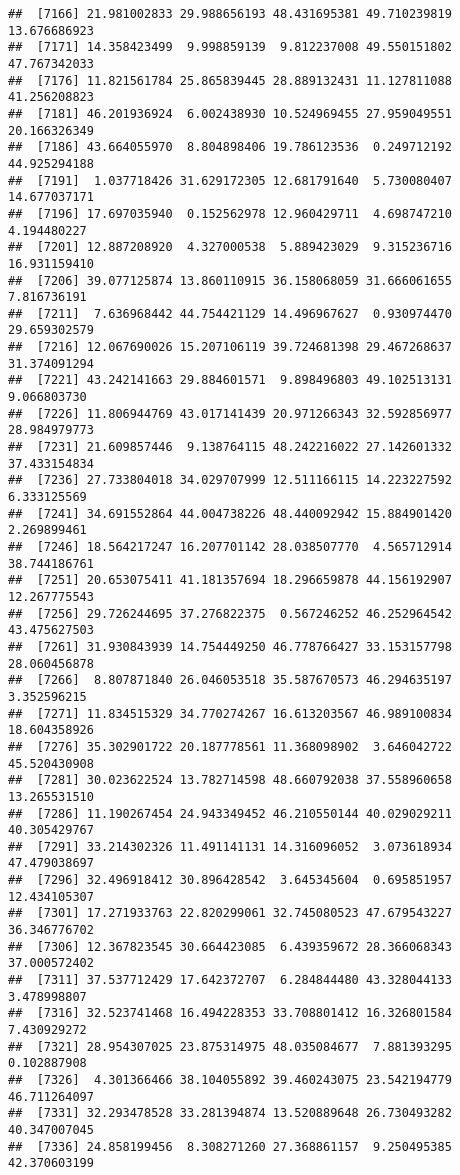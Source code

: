 \documentclass[
]{article}
\begin{document}
\begin{verbatim}
##  [7166] 21.981002833 29.988656193 48.431695381 49.710239819 13.676686923
##  [7171] 14.358423499  9.998859139  9.812237008 49.550151802 47.767342033
##  [7176] 11.821561784 25.865839445 28.889132431 11.127811088 41.256208823
##  [7181] 46.201936924  6.002438930 10.524969455 27.959049551 20.166326349
##  [7186] 43.664055970  8.804898406 19.786123536  0.249712192 44.925294188
##  [7191]  1.037718426 31.629172305 12.681791640  5.730080407 14.677037171
##  [7196] 17.697035940  0.152562978 12.960429711  4.698747210  4.194480227
##  [7201] 12.887208920  4.327000538  5.889423029  9.315236716 16.931159410
##  [7206] 39.077125874 13.860110915 36.158068059 31.666061655  7.816736191
##  [7211]  7.636968442 44.754421129 14.496967627  0.930974470 29.659302579
##  [7216] 12.067690026 15.207106119 39.724681398 29.467268637 31.374091294
##  [7221] 43.242141663 29.884601571  9.898496803 49.102513131  9.066803730
##  [7226] 11.806944769 43.017141439 20.971266343 32.592856977 28.984979773
##  [7231] 21.609857446  9.138764115 48.242216022 27.142601332 37.433154834
##  [7236] 27.733804018 34.029707999 12.511166115 14.223227592  6.333125569
##  [7241] 34.691552864 44.004738226 48.440092942 15.884901420  2.269899461
##  [7246] 18.564217247 16.207701142 28.038507770  4.565712914 38.744186761
##  [7251] 20.653075411 41.181357694 18.296659878 44.156192907 12.267775543
##  [7256] 29.726244695 37.276822375  0.567246252 46.252964542 43.475627503
##  [7261] 31.930843939 14.754449250 46.778766427 33.153157798 28.060456878
##  [7266]  8.807871840 26.046053518 35.587670573 46.294635197  3.352596215
##  [7271] 11.834515329 34.770274267 16.613203567 46.989100834 18.604358926
##  [7276] 35.302901722 20.187778561 11.368098902  3.646042722 45.520430908
##  [7281] 30.023622524 13.782714598 48.660792038 37.558960658 13.265531510
##  [7286] 11.190267454 24.943349452 46.210550144 40.029029211 40.305429767
##  [7291] 33.214302326 11.491141131 14.316096052  3.073618934 47.479038697
##  [7296] 32.496918412 30.896428542  3.645345604  0.695851957 12.434105307
##  [7301] 17.271933763 22.820299061 32.745080523 47.679543227 36.346776702
##  [7306] 12.367823545 30.664423085  6.439359672 28.366068343 37.000572402
##  [7311] 37.537712429 17.642372707  6.284844480 43.328044133  3.478998807
##  [7316] 32.523741468 16.494228353 33.708801412 16.326801584  7.430929272
##  [7321] 28.954307025 23.875314975 48.035084677  7.881393295  0.102887908
##  [7326]  4.301366466 38.104055892 39.460243075 23.542194779 46.711264097
##  [7331] 32.293478528 33.281394874 13.520889648 26.730493282 40.347007045
##  [7336] 24.858199456  8.308271260 27.368861157  9.250495385 42.370603199

\end{verbatim}
\end{document}
